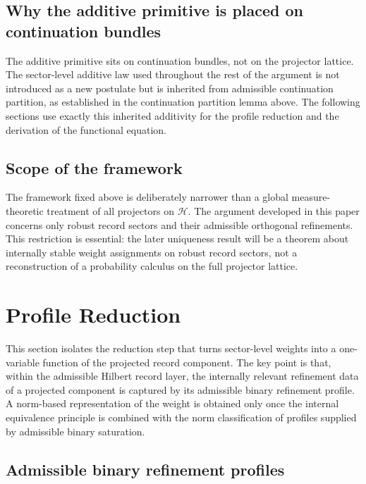 \documentclass[11pt]{article}
\theoremstyle{remark}
\numberwithin{equation}{section}
\newcommand{\HH}{\mathcal{H}}
\begin{document}
\subsection{Why the additive primitive is placed on continuation bundles}

The additive primitive sits on continuation bundles, not on the
projector lattice. The sector-level additive law used throughout the
rest of the argument is not introduced as a new postulate but is
inherited from admissible continuation partition, as established in
the continuation partition lemma above. The following sections use
exactly this inherited additivity for the profile reduction and the
derivation of the functional equation.

\subsection{Scope of the framework}
The framework fixed above is deliberately narrower than a global measure-theoretic treatment of all projectors on $\HH$. The argument developed in this paper concerns only robust record sectors and their admissible orthogonal refinements. This restriction is essential: the later uniqueness result will be a theorem about internally stable weight assignments on robust record sectors, not a reconstruction of a probability calculus on the full projector lattice.


\section{Profile Reduction}
\label{sec:profile-reduction}

This section isolates the reduction step that turns sector-level weights into a one-variable function of the projected record component. The key point is that, within the admissible Hilbert record layer, the internally relevant refinement data of a projected component is captured by its admissible binary refinement profile. A norm-based representation of the weight is obtained only once the internal equivalence principle is combined with the norm classification of profiles supplied by admissible binary saturation.

\subsection{Admissible binary refinement profiles}
\end{document}
